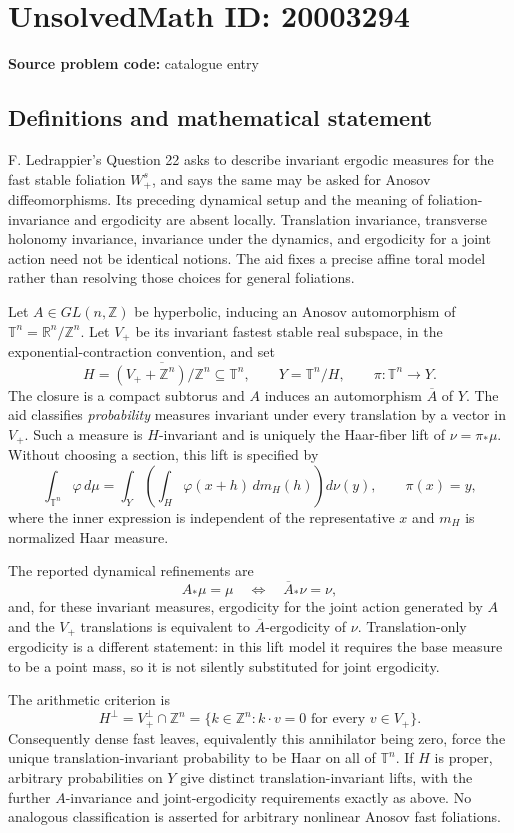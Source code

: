 \documentclass[11pt]{article}
\newcommand{\Z}{\mathbb{Z}}
\newcommand{\R}{\mathbb{R}}
\begin{document}
\section*{UnsolvedMath ID: 20003294}
\textbf{Source problem code:} catalogue entry
\subsection{Definitions and mathematical statement}
F. Ledrappier's Question 22 asks to describe invariant ergodic measures for the fast stable foliation $W^s_+$, and says the same may be asked for Anosov diffeomorphisms. Its preceding dynamical setup and the meaning of foliation-invariance and ergodicity are absent locally. Translation invariance, transverse holonomy invariance, invariance under the dynamics, and ergodicity for a joint action need not be identical notions. The aid fixes a precise affine toral model rather than resolving those choices for general foliations.

Let $A\in GL(n,\Z)$ be hyperbolic, inducing an Anosov automorphism of $\mathbb T^n=\R^n/\Z^n$. Let $V_+$ be its invariant fastest stable real subspace, in the exponential-contraction convention, and set
\[
 H=\overline{(V_++\Z^n)/\Z^n}\subseteq\mathbb T^n,
 \qquad Y=\mathbb T^n/H,\qquad\pi:\mathbb T^n\to Y.
\]
The closure is a compact subtorus and $A$ induces an automorphism $\overline A$ of $Y$. The aid classifies \emph{probability} measures invariant under every translation by a vector in $V_+$. Such a measure is $H$-invariant and is uniquely the Haar-fiber lift of $\nu=\pi_*\mu$. Without choosing a section, this lift is specified by
\[
 \int_{\mathbb T^n}\varphi\,d\mu
 =\int_Y\left(\int_H\varphi(x+h)\,dm_H(h)\right)d\nu(y),
 \qquad\pi(x)=y,
\]
where the inner expression is independent of the representative $x$ and $m_H$ is normalized Haar measure.

The reported dynamical refinements are
\[
 A_*\mu=\mu\quad\Longleftrightarrow\quad
 \overline A_*\nu=\nu,
\]
and, for these invariant measures, ergodicity for the joint action generated by $A$ and the $V_+$ translations is equivalent to $\overline A$-ergodicity of $\nu$. Translation-only ergodicity is a different statement: in this lift model it requires the base measure to be a point mass, so it is not silently substituted for joint ergodicity.

The arithmetic criterion is
\[
 H^\perp=V_+^\perp\cap\Z^n
 =\{k\in\Z^n:k\cdot v=0\text{ for every }v\in V_+\}.
\]
Consequently dense fast leaves, equivalently this annihilator being zero, force the unique translation-invariant probability to be Haar on all of $\mathbb T^n$. If $H$ is proper, arbitrary probabilities on $Y$ give distinct translation-invariant lifts, with the further $A$-invariance and joint-ergodicity requirements exactly as above. No analogous classification is asserted for arbitrary nonlinear Anosov fast foliations.
\end{document}
